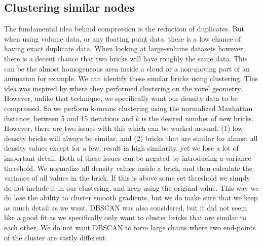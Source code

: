 \subsection{Clustering similar nodes} \label{approach:clustering_similar_nodes}
The fundamental idea behind compression is the reduction of duplicates. But when using volume data, or any floating point data, there is a low chance of having exact duplicate data. When looking at large-volume datasets however, there is a decent chance that two bricks will have roughly the same data. This can be the almost homogeneous area inside a cloud or a non-moving part of an animation for example. We can identify these similar bricks using clustering. This idea was inspired by \cite{van2020lossy} where they performed clustering on the voxel geometry. However, unlike that technique, we specifically want our density data to be compressed. So we perform k-means clustering using the normalized Manhattan distance, between 5 and 15 iterations and $k$ is the desired number of new bricks. However, there are two issues with this which can be worked around. (1) low-density bricks will always be similar, and (2) bricks that are similar for almost all density values except for a few, result in high similarity, yet we lose a lot of important detail. Both of these issues can be negated by introducing a variance threshold. We normalize all density values inside a brick, and then calculate the variance of all values in the brick. If this is above some set threshold we simply do not include it in our clustering, and keep using the original value. This way we do lose the ability to cluster smooth gradients, but we do make sure that we keep as much detail as we want. DBSCAN was also considered, but it did not seem like a good fit as we specifically only want to cluster bricks that are similar to each other. We do not want DBSCAN to form large chains where two end-points of the cluster are vastly different.
